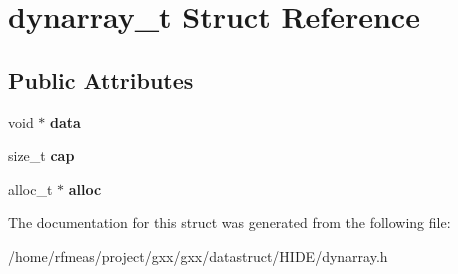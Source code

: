 \hypertarget{structdynarray__t}{}\section{dynarray\+\_\+t Struct Reference}
\label{structdynarray__t}
\subsection*{Public Attributes}
\begin{DoxyCompactItemize}
\item 
void $\ast$ {\bfseries data}\hypertarget{structdynarray__t_ac9150219f49c18dde1a54c86285137bc}{}\label{structdynarray__t_ac9150219f49c18dde1a54c86285137bc}

\item 
size\+\_\+t {\bfseries cap}\hypertarget{structdynarray__t_a4cb60c63f3f6a79014e31e881cb482cc}{}\label{structdynarray__t_a4cb60c63f3f6a79014e31e881cb482cc}

\item 
alloc\+\_\+t $\ast$ {\bfseries alloc}\hypertarget{structdynarray__t_a2636dafa9bd12bf6c4526887c9390ba3}{}\label{structdynarray__t_a2636dafa9bd12bf6c4526887c9390ba3}

\end{DoxyCompactItemize}


The documentation for this struct was generated from the following file\+:\begin{DoxyCompactItemize}
\item 
/home/rfmeas/project/gxx/gxx/datastruct/\+H\+I\+D\+E/dynarray.\+h\end{DoxyCompactItemize}
